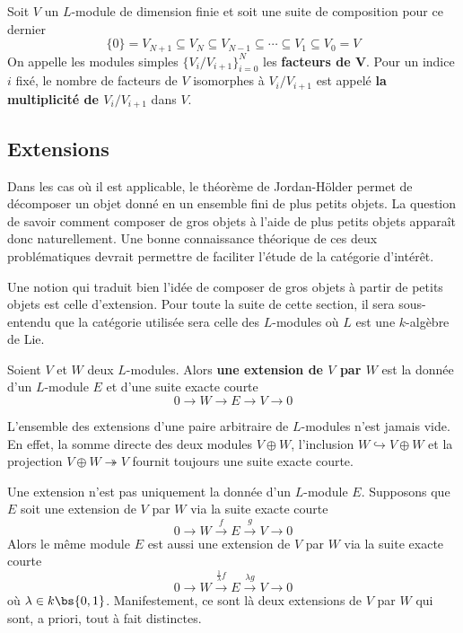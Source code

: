 \begin{Def} Soit $V$ un $L$-module de dimension finie et soit une suite de composition pour ce dernier 
$$ \{0\} = V_{N+1} \subseteq V_N \subseteq V_{N-1} \subseteq \cdots \subseteq V_1 \subseteq V_0 = V $$
On appelle les modules simples $\{V_i/V_{i+1}\}_{i=0}^N$ les \textbf{facteurs de V}. Pour un indice $i$ fixé, le nombre de facteurs de $V$ isomorphes à $V_i/V_{i+1}$ est appelé \textbf{la multiplicité de $V_i/V_{i+1}$} dans $V$.
\end{Def}



%
\subsection{Extensions}

Dans les cas où il est applicable, le théorème de Jordan-Hölder permet de décomposer un objet donné en un ensemble fini de plus petits objets. La question de savoir comment composer de gros objets à l'aide de plus petits objets apparaît donc naturellement. Une bonne connaissance théorique de ces deux problématiques devrait permettre de faciliter l'étude de la catégorie d'intérêt. 

Une notion qui traduit bien l'idée de composer de gros objets à partir de petits objets est celle d'extension. Pour toute la suite de cette section, il sera sous-entendu que la catégorie utilisée sera celle des $L$-modules où $L$ est une $k$-algèbre de Lie.

\begin{Def} Soient $V$ et $W$ deux $L$-modules. Alors \textbf{une extension de $V$ par $W$} est la donnée d'un $L$-module $E$ et d'une suite exacte courte 
$$ 0 \rightarrow W \rightarrow E \rightarrow V \rightarrow 0 $$
\end{Def}

\begin{Rem} L'ensemble des extensions d'une paire arbitraire de $L$-modules n'est jamais vide. En effet, la somme directe des deux modules $V \oplus W$, l'inclusion $W \hookrightarrow V \oplus W$ et la projection $V \oplus W \twoheadrightarrow V$ fournit toujours une suite exacte courte.
\end{Rem}

\begin{Rem} \label{avantequivalence} Une extension n'est pas uniquement la donnée d'un $L$-module $E$. Supposons que $E$ soit une extension de $V$ par $W$ via la suite exacte courte 
$$ 0 \rightarrow W \stackrel{f}{\longrightarrow} E \stackrel{g}{\longrightarrow} V \rightarrow 0 $$ 
Alors le même module $E$ est aussi une extension de $V$ par $W$ via la suite exacte courte
$$ 0 \rightarrow W \stackrel{\frac{1}{\lambda} f}{\longrightarrow} E \stackrel{\lambda g}{\longrightarrow} V \rightarrow 0 $$
où $\lambda \in k \bs \{0,1\}$. Manifestement, ce sont là deux extensions de $V$ par $W$ qui sont, a priori, tout à fait distinctes.
\end{Rem}

